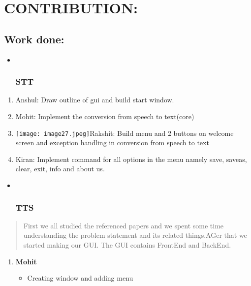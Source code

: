 \documentclass[]{article}
\begin{document}
\section{CONTRIBUTION:}\label{contribution}

\subsection{Work done:}\label{work-done}

\begin{itemize}
\item ~
  \subsubsection{STT}\label{stt}
\end{itemize}

\begin{enumerate}
\def\labelenumi{\arabic{enumi}.}
\item
  Anshul: Draw outline of gui and build start window.
\item
  Mohit: Implement the conversion from speech to text(core)
\item
  \texttt{[image: image27.jpeg]}Rakshit:
  Build menu and 2 buttons on welcome screen and exception handling in
  conversion from speech to text
\item
  Kiran: Implement command for all options in the menu namely save,
  saveas, clear, exit, info and about us.
\end{enumerate}

\begin{itemize}
\item ~
  \subsubsection{TTS}\label{tts}
\end{itemize}

\begin{quote}
First we all studied the referenced papers and we spent some time
understanding the problem statement and its related things.AGer that we
started making our GUI. The GUI contains FrontEnd and BackEnd.
\end{quote}

\begin{enumerate}
\def\labelenumi{\arabic{enumi}.}
\item
  \textbf{Mohit}

  \begin{itemize}
  \item
    Creating window and adding menu
  \end{itemize}
\end{enumerate}
\end{document}
